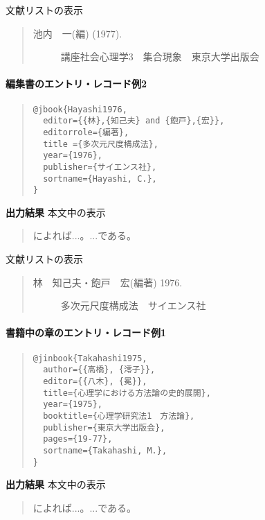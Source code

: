 \documentclass[12pt]{ltjsarticle}
\begin{document}
文献リストの表示

\begin{quote}
\begin{description}
  \item[\textrm{池内　一(編) (1977).}]講座社会心理学3　集合現象　東京大学出版会
\end{description}
\end{quote}

\paragraph{編集書のエントリ・レコード例2}

\begin{quote}
\begin{verbatim}
@jbook{Hayashi1976,
  editor={{林},{知己夫} and {飽戸},{宏}},
  editorrole={編著},
  title ={多次元尺度構成法}, 
  year={1976},
  publisher={サイエンス社},
  sortname={Hayashi, C.},
}\end{verbatim}
\end{quote}


\textbf{出力結果}
本文中の表示
\begin{quote}
\textcite{Hayashi1976}によれば...。...である\parencite{Hayashi1976}。
\end{quote}


文献リストの表示

\begin{quote}
\begin{description}
  \item[\textrm{林　知己夫・飽戸　宏(編著) 1976.}]多次元尺度構成法　サイエンス社
\end{description}
\end{quote}

\paragraph{書籍中の章のエントリ・レコード例1}

\begin{quote}
\begin{verbatim}
@jinbook{Takahashi1975,
  author={{高橋}, {澪子}},
  editor={{八木}, {冕}},
  title={心理学における方法論の史的展開},
  year={1975},
  booktitle={心理学研究法1　方法論},
  publisher={東京大学出版会},
  pages={19-77},
  sortname={Takahashi, M.},
}
\end{verbatim}
\end{quote}


\textbf{出力結果}
本文中の表示
\begin{quote}
\textcite{Takahashi1975}によれば...。...である\parencite{Takahashi1975}。
\end{quote}
\end{document}
